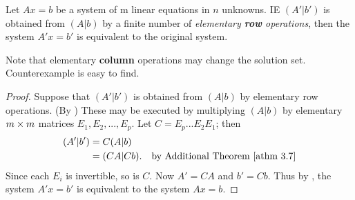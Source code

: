 \begin{corollary} \label{corollary 3.13.1}
Let \(Ax = b\) be a system of m linear equations in \(n\) unknowns.
IE \((A'|b')\) is obtained from \((A | b)\) by a finite number of \emph{elementary \textbf{row} operations}, then the system \(A'x = b'\) is equivalent to the original system.
\end{corollary}

\begin{note}
Note that elementary \textbf{column} operations may change the solution set.
Counterexample is easy to find.
\end{note}

\begin{proof}
Suppose that \((A'|b')\) is obtained from \((A|b)\) by elementary row
operations.
(By ) These may be executed by multiplying \((A|b)\) by elementary \(m \times m\) matrices \(E_1, E_2, ..., E_p\).
Let \(C = E_p ... E_2 E_1\);
then
\begin{align*}
    (A' | b') & = C(A | b) \\
              & = (CA | Cb). & \text{by \ATHM{3.7}}
\end{align*}
Since each \(E_i\) is invertible, so is \(C\). Now \(A' = CA\) and \(b' = Cb\).
Thus by , the system \(A'x = b'\) is equivalent to the system \(Ax = b\).
\end{proof}

